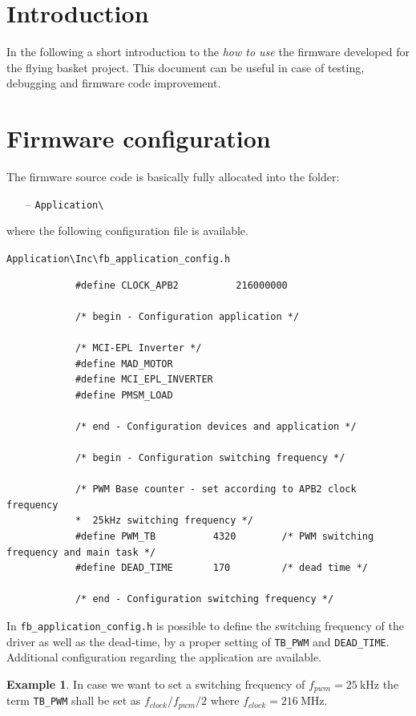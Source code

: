 \documentclass[11pt,a4paper,oneside]{book}
\numberwithin{equation}{section}
\theoremstyle{it}
\theoremstyle{definition}
\newtheorem{example}{Example}[section]
\begin{document}
\section{Introduction}	
In the following a short introduction to the \textit{how to use} the firmware developed for the flying basket project. This document can be useful in case of testing, debugging and firmware code improvement.

\section{Firmware configuration}	
The firmware source code is basically fully allocated into the folder:
\begin{itemize}
	\item[--] {\selectfont \verb+Application\+}
\end{itemize}	
where the following configuration file is available. 
\begin{mybox}
		{\selectfont \verb+Application\Inc\fb_application_config.h+}
	{\selectfont \footnotesize \noindent
		\begin{verbatim}
			#define CLOCK_APB2 			216000000
			
			/* begin - Configuration application */
			
			/* MCI-EPL Inverter */
			#define MAD_MOTOR
			#define MCI_EPL_INVERTER
			#define PMSM_LOAD
			
			/* end - Configuration devices and application */
			
			/* begin - Configuration switching frequency */
			
			/* PWM Base counter - set according to APB2 clock frequency
			*  25kHz switching frequency */
			#define PWM_TB 			4320 		/* PWM switching frequency and main task */
			#define DEAD_TIME 		170 		/* dead time */
			
			/* end - Configuration switching frequency */
	\end{verbatim}}
\end{mybox}

In {\selectfont \verb+fb_application_config.h+} is possible to define the switching frequency of the driver as well as the dead-time, by a proper setting of \texttt{TB\_PWM} and \texttt{DEAD\_TIME}. Additional configuration regarding the application are available.

\begin{example}
	In case we want to set a switching frequency of $f_{pwm} = \SI{25}{\kilo\hertz}$ the term \texttt{TB\_PWM} shall be set as $f_{clock}/f_{pwm}/2$ where $f_{clock} = \SI{216}{\mega\hertz}$.
\end{example}
\end{document}
